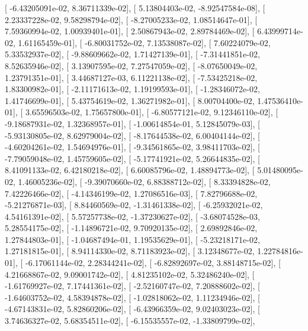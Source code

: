 \documentclass{article}
\begin{document}
       [ -6.43205091e-02,   8.36711339e-02],
       [  5.13804403e-02,  -8.92547584e-08],
       [  2.23337228e-02,   9.58298794e-02],
       [ -8.27005233e-02,   1.08514647e-01],
       [  7.59360994e-02,   1.00939401e-01],
       [  2.50867943e-02,   2.89784469e-02],
       [  6.43999714e-02,   1.61165459e-01],
       [ -6.80031752e-02,   7.13538087e-02],
       [  7.60224079e-02,   5.33532937e-02],
       [ -9.88609662e-02,   1.71427139e-01],
       [ -7.31441851e-02,   8.52635946e-02],
       [  3.13907595e-02,   7.27547059e-02],
       [ -8.07650049e-02,   1.23791351e-01],
       [  3.44687127e-03,   6.11221138e-02],
       [ -7.53425218e-02,   1.83300982e-01],
       [ -2.11171613e-02,   1.19199593e-01],
       [ -1.28346072e-02,   1.41746699e-01],
       [  5.43754619e-02,   1.36271982e-01],
       [  8.00704400e-02,   1.47536410e-01],
       [  3.65596503e-02,   1.75657800e-01],
       [ -6.80577121e-02,   9.12346110e-02],
       [ -9.18687931e-02,   1.32368957e-01],
       [ -1.00614854e-01,   5.12845079e-03],
       [ -5.93130805e-02,   8.62979004e-02],
       [ -8.17644538e-02,   6.00404144e-02],
       [ -4.60204261e-02,   1.54694976e-01],
       [ -9.34561865e-02,   3.98411703e-02],
       [ -7.79059048e-02,   1.45759605e-02],
       [ -5.17741921e-02,   5.26644835e-02],
       [  8.41091133e-02,   6.42180218e-02],
       [  6.60085796e-02,   1.48894773e-02],
       [  5.01480095e-02,   1.46005236e-02],
       [ -9.39070660e-02,   6.88388712e-02],
       [  8.33394828e-02,   7.42226466e-02],
       [ -4.14346199e-02,   1.27086516e-03],
       [  7.82796688e-02,  -5.21276871e-03],
       [  8.84460569e-02,  -1.31461338e-02],
       [ -6.25932021e-02,   4.54161391e-02],
       [  5.57257738e-02,  -1.37230627e-02],
       [ -3.68074528e-03,   5.28554175e-02],
       [ -1.14896721e-02,   9.70920135e-02],
       [  2.69892846e-02,   1.27844803e-01],
       [ -1.04687494e-01,   1.19535629e-01],
       [ -5.23218171e-02,   1.27181815e-01],
       [  8.94114330e-02,   8.71183923e-02],
       [  3.12348677e-02,   1.22784816e-01],
       [ -6.17061144e-02,   2.28344241e-02],
       [ -6.82892697e-02,   3.88148715e-02],
       [  4.21668867e-02,   9.09001742e-02],
       [  4.81235102e-02,   5.32486240e-02],
       [ -1.61769927e-02,   7.17441361e-02],
       [ -2.52160747e-02,   7.20888602e-02],
       [ -1.64603752e-02,   4.58394878e-02],
       [ -1.02818062e-02,   1.11234946e-02],
       [ -4.67143831e-02,   5.82860206e-02],
       [ -6.43966359e-02,   9.02403023e-02],
       [  3.74636327e-02,   5.68354511e-02],
       [ -6.15535557e-02,  -1.33809799e-02],
\end{document}
